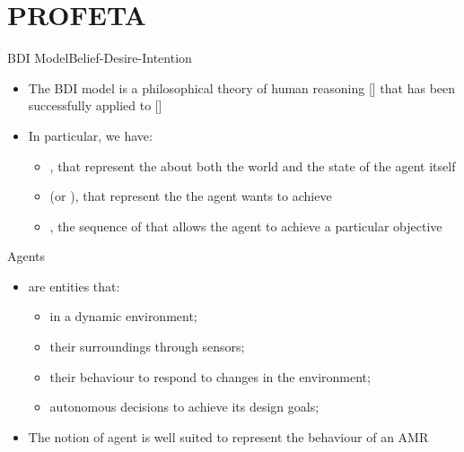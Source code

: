 \section{PROFETA}
\begin{frame}[label=3]{BDI Model}{Belief-Desire-Intention}  
\begin{itemize}
\item 
The BDI model is a philosophical theory of human reasoning 
   [] that has been successfully applied to 
    [] 
   \N
   \item
    In particular, we have:
    \begin{itemize}
      \n
      \item 
      , that represent the  about both the world and 
      the state of the agent itself
      \n
      \item
       (or ), that represent the  the agent wants to achieve
      \n
      \item
      , the sequence of  that allows the agent to achieve a particular objective
    \end{itemize}



\end{itemize}
  \N\N
\end{frame}

\begin{frame}[label=5]{Agents}
  
  \begin{itemize}
  \pause
  \item
    are entities that: 
  \begin{itemize}
    \item 
       in a dynamic environment;
    \item
       their surroundings through sensors;
    \item
       their behaviour to respond to changes in the environment;
    \item
       autonomous decisions to achieve its design goals;
    \end{itemize}
  \item
  \n
    The notion of agent is well suited to represent the behaviour of an AMR
  \end{itemize}

\end{frame}






